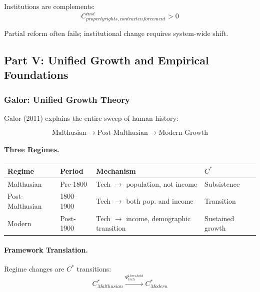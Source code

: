 Institutions are complements:
\begin{equation}
C_{property rights, contract enforcement}^{inst} > 0
\end{equation}

Partial reform often fails; institutional change requires system-wide shift.

\subsection{Part V: Unified Growth and Empirical Foundations}

\subsubsection{Galor: Unified Growth Theory}

Galor (2011) explains the entire sweep of human history:

\begin{equation}
\boxed{
\text{Malthusian} \to \text{Post-Malthusian} \to \text{Modern Growth}
}
\label{eq:galor}
\end{equation}

\paragraph{Three Regimes.}
\begin{center}
\renewcommand{\arraystretch}{1.3}
\begin{tabular}{|l|l|l|l|}
\hline
\textbf{Regime} & \textbf{Period} & \textbf{Mechanism} & \textbf{$C^*$} \\
\hline
Malthusian & Pre-1800 & Tech $\to$ population, not income & Subsistence \\
Post-Malthusian & 1800--1900 & Tech $\to$ both pop. and income & Transition \\
Modern & Post-1900 & Tech $\to$ income, demographic transition & Sustained growth \\
\hline
\end{tabular}
\end{center}

\paragraph{Framework Translation.}
Regime changes are $C^*$ transitions:
\begin{equation}
C^*_{Malthusian} \xrightarrow{\Psi_{tech}^{threshold}} C^*_{Modern}
\end{equation}

